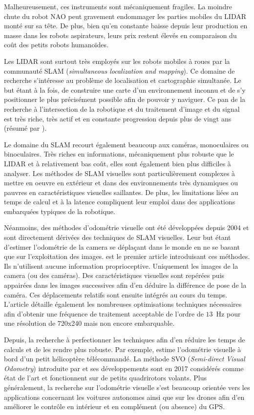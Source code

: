 Malheureusement, ces instruments sont mécaniquement fragiles.
La moindre chute du robot NAO peut gravement endommager les parties 
mobiles du LIDAR monté sur sa tête.
De plus, bien qu'en constante baisse depuis leur production en masse dans
les robots aspirateurs, leurs prix restent élevés en comparaison
du coût des petits robots humanoïdes.

Les LIDAR sont surtout très employés sur les robots mobiles à roues par
la communauté SLAM (\textit{simultaneous localization and mapping}).
Ce domaine de recherche s'intéresse au problème de localisation et
cartographie simultanée. 
Le but étant à la fois, de construire une carte d'un environnement 
inconnu et de s'y positionner le plus précisément possible afin de
pouvoir y naviguer.
Ce pan de la recherche à l'intersection de la robotique et 
du traitement d'image et du signal est très riche, très actif et 
en constante progression depuis plus de vingt ans 
(résumé par \cite{fuentes-pacheco_visual_2015}).

Le domaine du SLAM recourt également beaucoup aux
caméras, monoculaires ou binoculaires. 
Très riches en informations, mécaniquement plus robuste que 
le LIDAR et à relativement bas coût, elles sont également bien 
plus difficiles à analyser.
Les méthodes de SLAM visuelles sont particulièrement complexes 
à mettre en oeuvre en extérieur et dans des environnements 
très dynamiques ou pauvres en caractéristiques visuelles saillantes.
De plus, les limitations liées au temps de calcul et à la latence 
compliquent leur emploi dans des applications embarquées 
typiques de la robotique.

Néanmoins, des méthodes d'odométrie visuelle ont été développées depuis 
2004 et sont directement dérivées des techniques de SLAM visuelles. 
Leur but étant d'estimer l'odométrie de la camera se déplaçant dans
le monde en ne se basant que sur l'exploitation des images.
\cite{nister_visual_2004} est le premier article introduisant 
ces méthodes. Ils n'utilisent aucune information proprioceptive.
Uniquement les images de la camera (ou des caméras).
Des caractéristiques visuelles sont repérées puis appairées dans les images
successives afin d'en déduire la différence de pose de la caméra.
Ces déplacements relatifs sont ensuite intégrés au cours du temps.
L'article détaille également les nombreuses optimisations techniques nécessaires
afin d'obtenir une fréquence de traitement acceptable de l'ordre de $13$~Hz
pour une résolution de 720x240 mais non encore embarquable.

Depuis, la recherche à perfectionner les techniques afin d'en réduire
les temps de calculs et de les rendre plus robuste.
Par exemple, \cite{weiss_monocular-slambased_2011} 
estime l'odométrie visuelle à bord d'un petit hélicoptère télécommandé.
La méthode SVO (\textit{Semi-direct Visual Odometry}) introduite par
\cite{forster_svo:_2014} et ses développements sont en 2017 considérés 
comme état de l'art et fonctionnent sur de petits quadrirotors volants.
Plus généralement, la recherche sur l'odométrie visuelle s'est beaucoup
orientée vers les applications concernant les voitures autonomes ainsi que 
sur les drones afin d'en améliorer le contrôle en intérieur et en 
complément (ou absence) du GPS.

